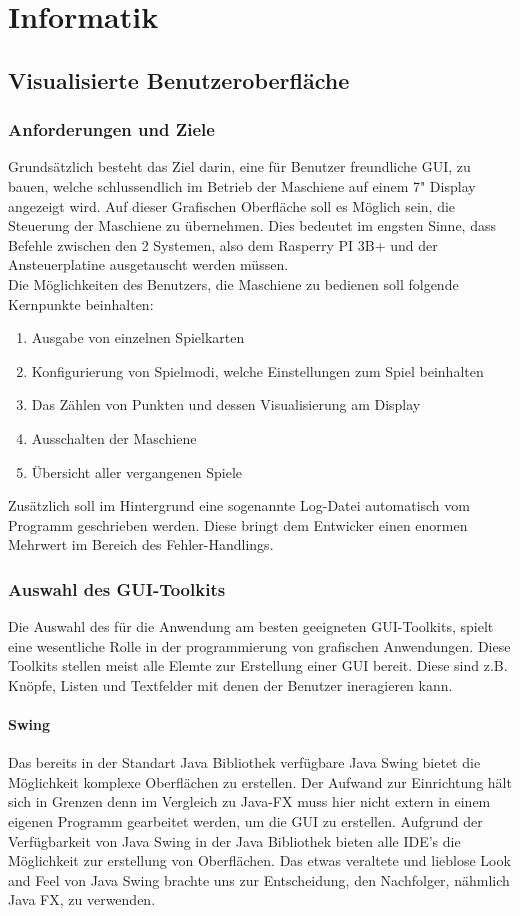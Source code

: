 
\chapter{Informatik}

\section{Visualisierte Benutzeroberfläche}
\subsection{Anforderungen und Ziele}
Grundsätzlich besteht das Ziel darin, eine für Benutzer freundliche GUI, zu bauen, welche schlussendlich im Betrieb der Maschiene auf einem 7" Display angezeigt wird. Auf dieser Grafischen Oberfläche soll es Möglich sein, die Steuerung der Maschiene zu übernehmen.
Dies bedeutet im engsten Sinne, dass Befehle zwischen den 2 Systemen, also dem Rasperry PI 3B+ und der Ansteuerplatine ausgetauscht werden müssen.\\
Die Möglichkeiten des Benutzers, die Maschiene zu bedienen soll folgende Kernpunkte beinhalten:
\begin{enumerate}
    \item Ausgabe von einzelnen Spielkarten
    \item Konfigurierung von Spielmodi, welche Einstellungen zum Spiel beinhalten
    \item Das Zählen von Punkten und dessen Visualisierung am Display
    \item Ausschalten der Maschiene
    \item Übersicht aller vergangenen Spiele
\end{enumerate}
Zusätzlich soll im Hintergrund eine sogenannte Log-Datei automatisch vom Programm geschrieben werden. Diese bringt dem Entwicker einen enormen Mehrwert im Bereich des Fehler-Handlings.
\subsection{Auswahl des GUI-Toolkits}
Die Auswahl des für die Anwendung am besten geeigneten GUI-Toolkits, spielt eine wesentliche Rolle in der programmierung von grafischen Anwendungen. Diese Toolkits stellen meist alle Elemte zur Erstellung einer GUI bereit. Diese sind z.B. Knöpfe, Listen und Textfelder mit denen der Benutzer ineragieren kann.

\subsubsection{Swing}
Das bereits in der Standart Java Bibliothek verfügbare Java Swing bietet die Möglichkeit komplexe Oberflächen zu erstellen. Der Aufwand zur Einrichtung hält sich in Grenzen denn im Vergleich zu Java-FX muss hier nicht extern in einem eigenen Programm gearbeitet werden, um die GUI zu erstellen.
Aufgrund der Verfügbarkeit von Java Swing in der Java Bibliothek bieten alle IDE's die Möglichkeit zur erstellung von Oberflächen. Das etwas veraltete und lieblose Look and Feel von Java Swing brachte uns zur Entscheidung, den Nachfolger, nähmlich Java FX, zu verwenden.
